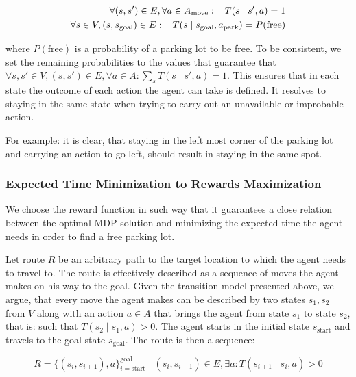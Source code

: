 \begin{eqnarray}
\forall (s, s') \in E, \forall a \in A_{\mathrm{move}} : \hspace{3mm} T(s \mid s', a) = 1 \\
\forall s \in V, (s,s_{\mathrm{goal}}) \in E : \hspace{3mm} T(s \mid s_{\mathrm{goal}}, a_{\mathrm{park}}) = P(\mathrm{free})
\end{eqnarray}

where $P(\mathrm{free})$ is a probability of a parking lot to be free. To be
consistent, we set the remaining probabilities to the values that guarantee
that $\forall s, s' \in V, (s, s') \in E, \forall a \in A: \sum_{s}T(s \mid
s', a) = 1$. This ensures that in each state the outcome of each action the
agent can take is defined. It resolves to staying in the same state when
trying to carry out an unavailable or improbable action.

For example: it is clear, that staying in the left most corner of the parking
lot and carrying an action to go left, should result in staying in the same
spot.

\subsubsection{Expected Time Minimization to Rewards Maximization} %
\label{ssub:expected_time_to_rewards}

We choose the reward function in such way that it guarantees a close relation
between the optimal MDP solution and minimizing the expected time the agent
needs in order to find a free parking lot.

Let route $R$ be an arbitrary path to the target location to which the agent
needs to travel to. The route is effectively described as a sequence of moves
the agent makes on his way to the goal. Given the transition model presented
above, we argue, that every move the agent makes can be described by two
states $s_1, s_2$ from $V$ along with an action $a \in A$ that brings the
agent from state $s_1$ to state $s_2$, that is: such that $T(s_2 \mid s_1, a)
> 0$. The agent starts in the initial state $s_\mathrm{start}$ and travels to
the goal state $s_\mathrm{goal}$. The route is then a sequence:

\begin{equation}
R = \{(s_i, s_{i+1}), a \}_{i=\mathrm{start}}^{\mathrm{goal}} \mid (s_i, s_{i+1}) \in E, \exists a: T(s_{i+1} \mid s_i, a) > 0
\end{equation}

